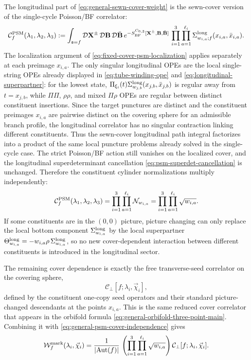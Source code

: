 \documentclass[11pt]{article}
\newcommand{\mc}[1]{\mathcal{#1}}
\begin{document}
The longitudinal part of \eqref{eq:general-sewn-cover-weight} is the sewn-cover version of the single-cycle Poisson/BF correlator:
\begin{equation}\label{eq:general-psm-cover-factor}
\mc C_f^{\rm PSM}(\lambda_1,\lambda_2,\lambda_3)
:=
\int_{\mathfrak s=f}
\mc D\mathbf X^\pm\,\mc D\mathbf B\,\mc D\bar{\mathbf B}\,
e^{-S_{\rm BF}^{C_{0,3}}[\mathbf X^\pm,\mathbf B,\bar{\mathbf B}]}\,
\prod_{i=1}^3\prod_{a=1}^{\ell_i}
\Sigma^{\rm long}_{w_{i,a};f}(x_{i,a},\bar x_{i,a}).
\end{equation}
The localization argument of \eqref{eq:fixed-cover-psm-localization} applies separately at each preimage $x_{i,a}$. The only singular longitudinal OPEs are the local single-string OPEs already displayed in \eqref{eq:tube-winding-ope} and \eqref{eq:longitudinal-superpartner}: for the lowest state, $\Pi_{\xi_i}(t)\Sigma^{\rm long}_{w_{j,b}}(x_{j,b},\bar x_{j,b})$ is regular away from $t=x_{j,b}$, while $\Pi\Pi$, $\rho\rho$, and mixed $\Pi\rho$ OPEs are regular between distinct constituent insertions. Since the target punctures are distinct and the constituent preimages $x_{i,a}$ are pairwise distinct on the covering sphere for an admissible branch profile, the longitudinal correlator has no singular contraction linking different constituents. Thus the sewn-cover longitudinal path integral factorizes into a product of the same local puncture problems already solved in the single-cycle case. The strict Poisson/BF action still vanishes on the localized cover, and the longitudinal superdeterminant cancellation \eqref{eq:psm-superdet-cancellation} is unchanged. Therefore the constituent cylinder normalizations multiply independently:
\begin{equation}\label{eq:general-psm-cover-independence}
\mc C_f^{\rm PSM}(\lambda_1,\lambda_2,\lambda_3)
=
\prod_{i=1}^3 \prod_{a=1}^{\ell_i} \mc N_{w_{i,a}}
=
\prod_{i=1}^3 \prod_{a=1}^{\ell_i} \sqrt{w_{i,a}}.
\end{equation}
If some constituents are in the $(0,0)$ picture, picture changing can only replace the local bottom component $\Sigma^{\rm long}_{w_{i,a}}$ by the local superpartner $\Theta^{\rm long}_{w_{i,a}}=-w_{i,a}\rho\,\Sigma^{\rm long}_{w_{i,a}}$, so no new cover-dependent interaction between different constituents is introduced in the longitudinal sector.

The remaining cover dependence is exactly the free transverse-seed correlator on the covering sphere,
\begin{equation}\label{eq:general-cover-transverse-factor}
\mc C_\perp[f;\lambda_i,\vec\chi_i],
\end{equation}
defined by the constituent one-copy seed operators and their standard picture-changed descendants at the points $x_{i,a}$. This is the same reduced cover correlator that appears in the orbifold formula \eqref{eq:general-orbifold-three-point-main}. Combining it with \eqref{eq:general-psm-cover-independence} gives
\begin{equation}\label{eq:general-cover-weight-factorization-main}
\mc W_f^{\rm mark}(\lambda_i,\vec\chi_i)
=
\frac{1}{|\mathrm{Aut}(f)|}\,
\left(
\prod_{i=1}^3 \prod_{a=1}^{\ell_i} \sqrt{w_{i,a}}
\right)
\mc C_\perp[f;\lambda_i,\vec\chi_i].
\end{equation}
\end{document}
